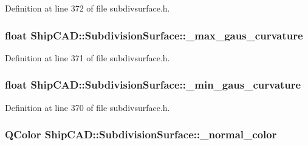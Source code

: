 Definition at line 372 of file subdivsurface.\-h.

\hypertarget{classShipCAD_1_1SubdivisionSurface_a1658374385131656d359ff373d2cb08c}{
\subsubsection[{\-\_\-max\-\_\-gaus\-\_\-curvature}]{\setlength{\rightskip}{0pt plus 5cm}float Ship\-C\-A\-D\-::\-Subdivision\-Surface\-::\-\_\-max\-\_\-gaus\-\_\-curvature\hspace{0.3cm}{\ttfamily [protected]}}}\label{classShipCAD_1_1SubdivisionSurface_a1658374385131656d359ff373d2cb08c}


Definition at line 371 of file subdivsurface.\-h.

\hypertarget{classShipCAD_1_1SubdivisionSurface_ac343c30f7e4e6a5926fdfed7da3f9385}{
\subsubsection[{\-\_\-min\-\_\-gaus\-\_\-curvature}]{\setlength{\rightskip}{0pt plus 5cm}float Ship\-C\-A\-D\-::\-Subdivision\-Surface\-::\-\_\-min\-\_\-gaus\-\_\-curvature\hspace{0.3cm}{\ttfamily [protected]}}}\label{classShipCAD_1_1SubdivisionSurface_ac343c30f7e4e6a5926fdfed7da3f9385}


Definition at line 370 of file subdivsurface.\-h.

\hypertarget{classShipCAD_1_1SubdivisionSurface_a62cbe24451a794c0da3660ed0f1066ca}{
\subsubsection[{\-\_\-normal\-\_\-color}]{\setlength{\rightskip}{0pt plus 5cm}Q\-Color Ship\-C\-A\-D\-::\-Subdivision\-Surface\-::\-\_\-normal\-\_\-color\hspace{0.3cm}{\ttfamily [protected]}}}\label{classShipCAD_1_1SubdivisionSurface_a62cbe24451a794c0da3660ed0f1066ca}


